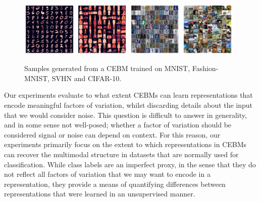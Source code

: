 \documentclass{article}
\begin{document}
\begin{figure}[!t]
\centering
\includegraphics[width=0.235\textwidth]{figures/mnist_cebm_buffer_samples.pdf}
\includegraphics[width=0.235\textwidth]{figures/fmnist_cebm_samples.pdf}
\includegraphics[width=0.235\textwidth]{figures/svhn_cebm_buffer_samples3.pdf}
\includegraphics[width=0.235\textwidth]{figures/cifar10_cebm_buffer_samples.pdf}
\vspace*{-1.5ex}
\caption{Samples generated from a CEBM trained on MNIST, Fashion-MNIST, SVHN and CIFAR-10.}
\label{fig:generated-samples}
\end{figure}

Our experiments evaluate to what extent CEBMs can learn representations that encode meaningful factors of variation, whilst discarding details about the input that we would consider noise. This question is difficult to answer in generality, and in some sense not well-posed; whether a factor of variation should be considered signal or noise can depend on context. For this reason, our experiments primarily focus on the extent to which representations in CEBMs can recover the multimodal structure in datasets that are normally used for classification. %
While class labels are an imperfect proxy, in the sense that they do not reflect all factors of variation that we may want to encode in a representation, they provide a means of quantifying differences between representations that were learned in an unsupervised manner. 
\end{document}
